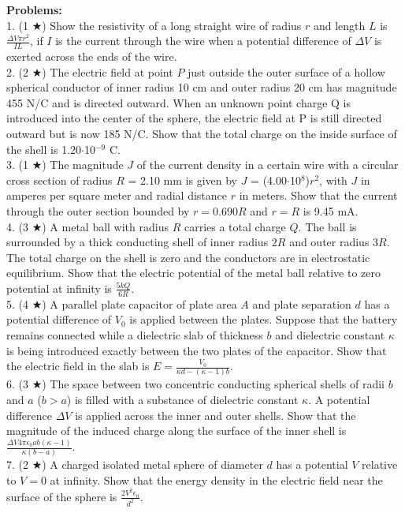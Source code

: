 \noindent\textbf{Problems:}\\
1. (1 $\bigstar$) Show the resistivity of a long straight wire of radius $r$ and length $L$ is $\frac{\Delta V\pi r^2}{IL}$, if $I$ is the current through the wire when a potential difference of $\Delta V$ is exerted across the ends of the wire.\\
2. (2 $\bigstar$) The electric field at point $P$ just outside the outer surface of a hollow spherical conductor of inner radius 10 cm and outer radius 20 cm has magnitude 455 N/C and is directed outward. When an unknown point charge Q is introduced into the center of the sphere, the electric field at P is still directed outward but is now 185 N/C. Show that the total charge on the inside surface of the shell is 1.20$\cdot$10$^{-9}$ C.\\
3. (1 $\bigstar$) The magnitude $J$ of the current density in a certain wire with a circular cross section of radius $R$ = 2.10 mm is given by $J$ = (4.00$\cdot$10$^8$)$r^2$, with $J$ in amperes per square meter and radial distance $r$ in meters. Show that the current through the outer section bounded by $r = 0.690R$ and $r = R$ is 9.45 mA.\\
4. (3 $\bigstar$) A metal ball with radius $R$ carries a total charge $Q$. The ball is surrounded by a thick conducting shell of inner radius $2R$ and outer radius $3R$. The total charge on the shell is zero and the conductors are in electrostatic equilibrium. Show that the electric potential of the metal ball relative to zero potential at infinity is $\frac{5kQ}{6R}$.\\
5. (4 $\bigstar$) A parallel plate capacitor of plate area $A$ and plate separation $d$ has a potential difference of $V_0$ is applied between the plates. Suppose that the battery remains connected while a dielectric slab of thickness $b$ and dielectric constant $\kappa$ is being introduced exactly between the two plates of the capacitor. Show that the electric field in the slab is $E = \frac{V_0}{\kappa d - (\kappa -1) b}$.\\
6. (3 $\bigstar$) The space between two concentric conducting spherical shells of radii $b$ and $a$ ($b>a$) is filled with a substance of dielectric constant $\kappa$. A potential difference $\Delta V$ is applied across the inner and outer shells. Show that the magnitude of the induced charge along the surface of the inner shell is $\frac{\Delta V 4\pi \epsilon_0 ab (\kappa -1)}{\kappa(b-a)}$.\\
7. (2 $\bigstar$) A charged isolated metal sphere of diameter $d$ has a potential $V$ relative to $V=0$ at infinity. Show that the energy density in the electric field near the surface of the sphere is $\frac{2V^2\epsilon_0}{d^2}$.\\
